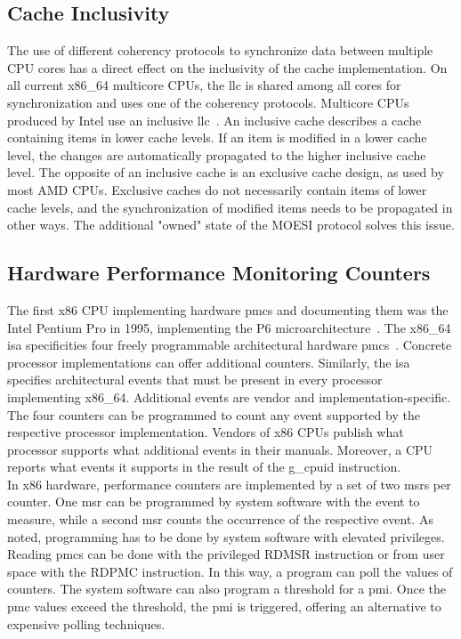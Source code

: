 \subsection{Cache Inclusivity}
\label{sec:state:technical:caches_inclusivity}
The use of different coherency protocols to synchronize data between multiple
CPU cores has a direct effect on the inclusivity of the cache implementation. On
all current x86\_64 multicore CPUs, the \gls{llc} is shared among all cores for
synchronization and uses one of the coherency protocols. Multicore CPUs produced
by Intel use an inclusive \gls{llc}~\cite{intel_optimization}. An inclusive
cache describes a cache containing items in lower cache levels. If an item is
modified in a lower cache level, the changes are automatically propagated to the
higher inclusive cache level. The opposite of an inclusive cache is an exclusive
cache design, as used by most AMD CPUs. Exclusive caches do not necessarily
contain items of lower cache levels, and the synchronization of modified items
needs to be propagated in other ways. The additional "owned" state of the MOESI
protocol solves this issue.

\subsection{Hardware Performance Monitoring Counters}
\label{sec:state:technical:hpc}
The first x86 CPU implementing hardware \glspl{pmc} and documenting them was the
Intel Pentium Pro in 1995, implementing the P6
microarchitecture~\cite{intel_sdm}. The x86\_64 \gls{isa} specificities four
freely programmable architectural hardware \glspl{pmc}~\cite{amd_manual}.
Concrete processor implementations can offer additional counters. Similarly, the
\gls{isa} specifies architectural events that must be present in every processor
implementing x86\_64. Additional events are vendor and implementation-specific.
The four counters can be programmed to count any event supported by the
respective processor implementation. Vendors of x86 CPUs publish what processor
supports what additional events in their manuals. Moreover, a CPU reports what
events it supports in the result of the \gls{g_cpuid} instruction. \\

In x86 hardware, performance counters are implemented by a set of two
\glspl{msr} per counter. One \gls{msr} can be programmed by system software with
the event to measure, while a second \gls{msr} counts the occurrence of the
respective event. As noted, programming has to be done by system software with
elevated privileges. Reading \glspl{pmc} can be done with the privileged RDMSR
instruction or from user space with the RDPMC instruction. In this way, a
program can poll the values of counters. The system software can also program a
threshold for a \gls{pmi}. Once the \gls{pmc} values exceed the threshold, the
\gls{pmi} is triggered, offering an alternative to expensive polling
techniques.\\

